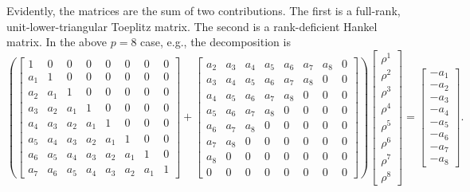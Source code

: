 \documentclass[12pt,letterpaper]{article}
\begin{document}
Evidently, the matrices are the sum of two contributions. The first is a
full-rank, unit-lower-triangular Toeplitz matrix. The second is a
rank-deficient Hankel matrix. In the above $p=8$ case, e.g., the decomposition
is
\[
\left(
\begin{bmatrix}
 1 & 0 & 0 & 0 & 0 & 0 & 0 & 0 \\
 a_1 & 1 & 0 & 0 & 0 & 0 & 0 & 0 \\
 a_2 & a_1 & 1 & 0 & 0 & 0 & 0 & 0 \\
 a_3 & a_2 & a_1 & 1 & 0 & 0 & 0 & 0 \\
 a_4 & a_3 & a_2 & a_1 & 1 & 0 & 0 & 0 \\
 a_5 & a_4 & a_3 & a_2 & a_1 & 1 & 0 & 0 \\
 a_6 & a_5 & a_4 & a_3 & a_2 & a_1 & 1 & 0 \\
 a_7 & a_6 & a_5 & a_4 & a_3 & a_2 & a_1 & 1
\end{bmatrix}
+
\begin{bmatrix}
 a_2 & a_3 & a_4 & a_5 & a_6 & a_7 & a_8 & 0 \\
 a_3 & a_4 & a_5 & a_6 & a_7 & a_8 & 0 & 0 \\
 a_4 & a_5 & a_6 & a_7 & a_8 & 0 & 0 & 0 \\
 a_5 & a_6 & a_7 & a_8 & 0 & 0 & 0 & 0 \\
 a_6 & a_7 & a_8 & 0 & 0 & 0 & 0 & 0 \\
 a_7 & a_8 & 0 & 0 & 0 & 0 & 0 & 0 \\
 a_8 & 0 & 0 & 0 & 0 & 0 & 0 & 0 \\
 0 & 0 & 0 & 0 & 0 & 0 & 0 & 0
\end{bmatrix}
\right)
\begin{bmatrix}
 \rho^1 \\
 \rho^2 \\
 \rho^3 \\
 \rho^4 \\
 \rho^5 \\
 \rho^6 \\
 \rho^7 \\
 \rho^8
\end{bmatrix}
=
\begin{bmatrix}
 -a_1 \\
 -a_2 \\
 -a_3 \\
 -a_4 \\
 -a_5 \\
 -a_6 \\
 -a_7 \\
 -a_8
\end{bmatrix}
.
\]
\end{document}
